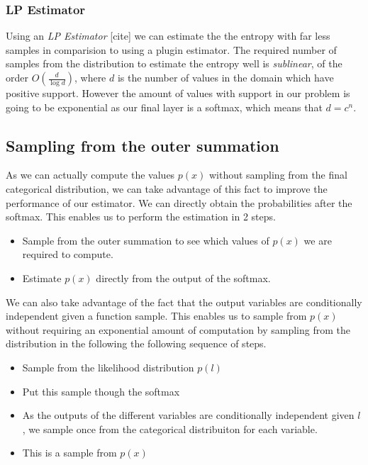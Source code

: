 \documentclass[12pt, a4paper]{report}
\theoremstyle{definition}
\begin{document}
\subsubsection{LP Estimator}

Using an \textit{LP Estimator} [cite] we can estimate the the entropy with far less samples in comparision to using a plugin estimator. The required number of samples from the distribution to estimate the entropy well is \textit{sublinear}, of the order $O \left( \frac{d}{\log{d}}\right)$, where $d$ is the number of values in the domain which have positive support. However the amount of values with support in our problem is going to be exponential as our final layer is a softmax, which means that $d = c^n$.


\subsection{Sampling from the outer summation}

As we can actually compute the values $p(x)$ without sampling from the final categorical distribution, we can take advantage of this fact to improve the performance of our estimator. We can directly obtain the probabilities after the softmax. This enables us to perform the estimation in 2 steps.

\begin{itemize}
    \item Sample from the outer summation to see which values of $p(x)$ we are required to compute.
    \item Estimate $p(x)$ directly from the output of the softmax.
\end{itemize}

We can also take advantage of the fact that the output variables are conditionally independent given a function sample. This enables us to sample from $p(x)$ without requiring an exponential amount of computation by sampling from the distribution in the following the following sequence of steps.

\begin{itemize}
    \item Sample from the likelihood distribution $p(l)$
    \item Put this sample though the softmax
    \item As the outputs of the different variables are conditionally independent given $l$, we sample once from the categorical distribuiton for each variable.
    \item This is a sample from $p(x)$
\end{itemize}
\end{document}
